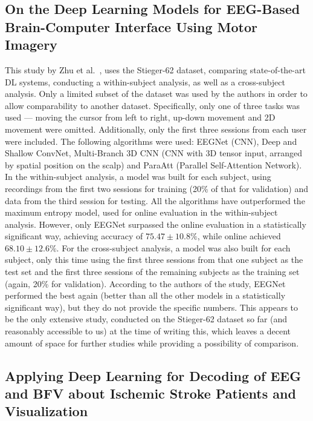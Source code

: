 \documentclass[english, he, bc, kiv, iso690alph, viewonly]{fasthesis}
\begin{document}
\subsection{On the Deep Learning Models for EEG-Based Brain-Computer Interface Using Motor Imagery}

This study by Zhu et al.~\cite{zhu:dl:bci:mi:22}, uses the Stieger-62 dataset, comparing state-of-the-art DL systems, conducting a within-subject analysis, as well as a cross-subject analysis. Only a limited subset of the dataset was used by the authors in order to allow comparability to another dataset. Specifically, only one of three tasks was used --- moving the cursor from left to right, up-down movement and 2D movement were omitted. Additionally, only the first three sessions from each user were included.
The following algorithms were used: EEGNet (CNN), Deep and Shallow ConvNet, Multi-Branch 3D CNN (CNN with 3D tensor input, arranged by spatial position on the scalp) and ParaAtt (Parallel Self-Attention Network). In the within-subject analysis, a model was built for each subject, using recordings from the first two sessions for training (20\% of that for validation) and data from the third session for testing. All the algorithms have outperformed the maximum entropy model, used for online evaluation in the within-subject analysis. However, only EEGNet surpassed the online evaluation in a statistically significant way, achieving accuracy of $75.47 \pm 10.8\%$, while online achieved $68.10 \pm 12.6\%$.\@
For the cross-subject analysis, a model was also built for each subject, only this time using the first three sessions from that one subject as the test set  and the first three sessions of the remaining subjects as the training set (again, 20\% for validation). According to the authors of the study, EEGNet performed the best again (better than all the other models in a statistically significant way), but they do not provide the specific numbers.
This appears to be the only extensive study, conducted on the Stieger-62 dataset so far (and reasonably accessible to us) at the time of writing this, which leaves a decent amount of space for further studies while providing a possibility of comparison.

\subsection{Applying Deep Learning for Decoding of EEG and BFV about Ischemic Stroke Patients and Visualization}
\end{document}
